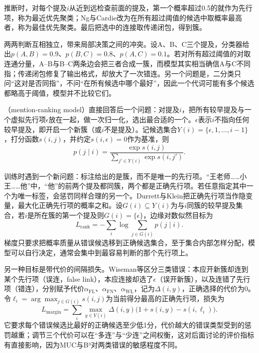 推断时，对每个提及$i$从近到远检查前面的提及，第一个概率超过0.5的就作为先行项，称为最近优先聚类；Ng与Cardie改为在所有超过阈值的候选中取概率最高者，称为最佳优先聚类。最后把选中的连接取传递闭包，得到簇。

两两判断互相独立，带来局部决策之间的冲突。设A、B、C三个提及，分类器给出$p(A,B)=0.9$、$p(B,C)=0.8$、$p(A,C)=0.1$。若对所有超过阈值的对取连通分量，A--B与B--C两条边会把三者合成一簇，而模型其实相当确信A与C不同指；传递闭包修复了输出格式，却放大了一次错连。另一个问题是，二分类只问“这对是否同指”，不问“在所有候选中哪个最好”，因此一个代词可能有多个候选都略高于阈值，模型并不比较它们。

（mention-ranking model）直接回答后一个问题：对提及$i$，把所有较早提及与一个虚拟先行项$\epsilon$放在一起，做一次归一化，选出最合适的一个。$\epsilon$表示$i$不指向任何较早提及，即开启一个新簇（或$i$不是提及）。记候选集合$Y(i)=\{\epsilon,1,\ldots,i-1\}$，打分函数$s(i,j)$，并约定$s(i,\epsilon)=0$作为基准，则
\begin{equation}
  p(j\mid i)=\frac{\exp s(i,j)}{\sum_{j'\in Y(i)}\exp s(i,j')}.
  \label{eq:nlp-analysis-antecedent-softmax}
\end{equation}

训练时遇到一个新问题：标注给出的是簇，而不是唯一的先行项。“王老师……小王……他”中，“他”的前两个提及都同簇，两个都是正确先行项。若任意指定其中一个为唯一标签，会惩罚同样合理的另一个。Durrett与Klein把正确先行项当作隐变量，最大化正确先行项的概率之和。设$G(i)\subseteq Y(i)$为与$i$同簇的较早提及集合，若$i$是所在簇的第一个提及则$G(i)=\{\epsilon\}$，边缘对数似然目标为
\begin{equation}
  L_{\mathrm{rank}}=-\sum_i\log\sum_{j\in G(i)}p(j\mid i).
  \label{eq:nlp-analysis-coreference-marginal}
\end{equation}
梯度只要求把概率质量从错误候选移到正确候选集合，至于集合内部怎样分配，模型可以自行决定，通常会集中到最容易判断的那个先行项上。

另一种目标是带代价的间隔损失。Wiseman等区分三类错误：本应开新簇却连到某个先行项（误连，false link），本应连接却选了$\epsilon$（误开新簇），以及连错了先行项（错连），分别赋予代价$\alpha_{\mathrm{FL}}$、$\alpha_{\mathrm{FN}}$、$\alpha_{\mathrm{WL}}$，记为$\Delta(i,y)$，正确选择的代价为0。令$\ell_i=\arg\max_{j\in G(i)}s(i,j)$为当前得分最高的正确先行项，损失为
\begin{equation}
  L_{\mathrm{margin}}=\sum_i\max_{y\in Y(i)}\Delta(i,y)\bigl(1+s(i,y)-s(i,\ell_i)\bigr).
  \label{eq:nlp-analysis-coreference-margin}
\end{equation}
它要求每个错误候选比最好的正确候选至少低1分，代价越大的错误类型受到的惩罚越重；调节三个代价可以在“多连”与“少连”之间权衡，这对后面讨论的评价指标有直接影响，因为MUC与B³对两类错误的敏感程度不同。

